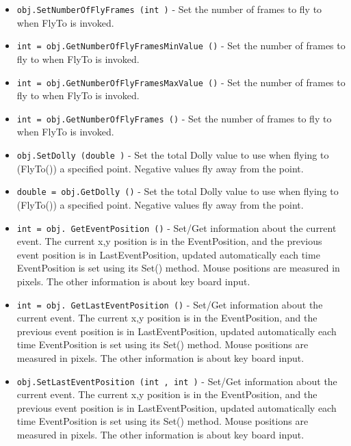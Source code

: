 \begin{itemize}
\item  \verb|obj.SetNumberOfFlyFrames (int )| -  Set the number of frames to fly to when FlyTo is invoked.

\item  \verb|int = obj.GetNumberOfFlyFramesMinValue ()| -  Set the number of frames to fly to when FlyTo is invoked.

\item  \verb|int = obj.GetNumberOfFlyFramesMaxValue ()| -  Set the number of frames to fly to when FlyTo is invoked.

\item  \verb|int = obj.GetNumberOfFlyFrames ()| -  Set the number of frames to fly to when FlyTo is invoked.

\item  \verb|obj.SetDolly (double )| -  Set the total Dolly value to use when flying to (FlyTo()) a
 specified point. Negative values fly away from the point.

\item  \verb|double = obj.GetDolly ()| -  Set the total Dolly value to use when flying to (FlyTo()) a
 specified point. Negative values fly away from the point.

\item  \verb|int = obj. GetEventPosition ()| -  Set/Get information about the current event. 
 The current x,y position is in the EventPosition, and the previous
 event position is in LastEventPosition, updated automatically each
 time EventPosition is set using its Set() method. Mouse positions
 are measured in pixels.
 The other information is about key board input.

\item  \verb|int = obj. GetLastEventPosition ()| -  Set/Get information about the current event. 
 The current x,y position is in the EventPosition, and the previous
 event position is in LastEventPosition, updated automatically each
 time EventPosition is set using its Set() method. Mouse positions
 are measured in pixels.
 The other information is about key board input.

\item  \verb|obj.SetLastEventPosition (int , int )| -  Set/Get information about the current event. 
 The current x,y position is in the EventPosition, and the previous
 event position is in LastEventPosition, updated automatically each
 time EventPosition is set using its Set() method. Mouse positions
 are measured in pixels.
 The other information is about key board input.


\end{itemize}
